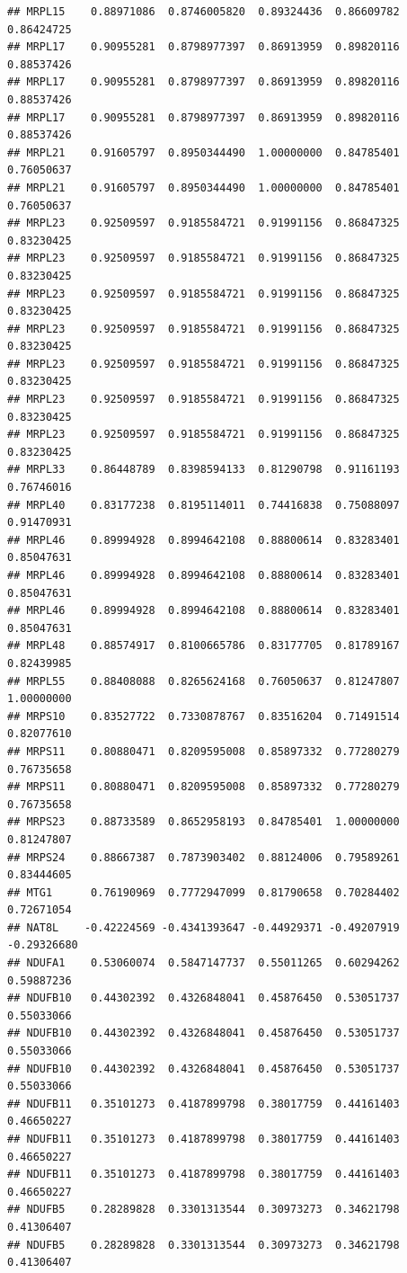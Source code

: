 \documentclass[
]{article}
\begin{document}
\begin{verbatim}
## MRPL15    0.88971086  0.8746005820  0.89324436  0.86609782  0.86424725
## MRPL17    0.90955281  0.8798977397  0.86913959  0.89820116  0.88537426
## MRPL17    0.90955281  0.8798977397  0.86913959  0.89820116  0.88537426
## MRPL17    0.90955281  0.8798977397  0.86913959  0.89820116  0.88537426
## MRPL21    0.91605797  0.8950344490  1.00000000  0.84785401  0.76050637
## MRPL21    0.91605797  0.8950344490  1.00000000  0.84785401  0.76050637
## MRPL23    0.92509597  0.9185584721  0.91991156  0.86847325  0.83230425
## MRPL23    0.92509597  0.9185584721  0.91991156  0.86847325  0.83230425
## MRPL23    0.92509597  0.9185584721  0.91991156  0.86847325  0.83230425
## MRPL23    0.92509597  0.9185584721  0.91991156  0.86847325  0.83230425
## MRPL23    0.92509597  0.9185584721  0.91991156  0.86847325  0.83230425
## MRPL23    0.92509597  0.9185584721  0.91991156  0.86847325  0.83230425
## MRPL23    0.92509597  0.9185584721  0.91991156  0.86847325  0.83230425
## MRPL33    0.86448789  0.8398594133  0.81290798  0.91161193  0.76746016
## MRPL40    0.83177238  0.8195114011  0.74416838  0.75088097  0.91470931
## MRPL46    0.89994928  0.8994642108  0.88800614  0.83283401  0.85047631
## MRPL46    0.89994928  0.8994642108  0.88800614  0.83283401  0.85047631
## MRPL46    0.89994928  0.8994642108  0.88800614  0.83283401  0.85047631
## MRPL48    0.88574917  0.8100665786  0.83177705  0.81789167  0.82439985
## MRPL55    0.88408088  0.8265624168  0.76050637  0.81247807  1.00000000
## MRPS10    0.83527722  0.7330878767  0.83516204  0.71491514  0.82077610
## MRPS11    0.80880471  0.8209595008  0.85897332  0.77280279  0.76735658
## MRPS11    0.80880471  0.8209595008  0.85897332  0.77280279  0.76735658
## MRPS23    0.88733589  0.8652958193  0.84785401  1.00000000  0.81247807
## MRPS24    0.88667387  0.7873903402  0.88124006  0.79589261  0.83444605
## MTG1      0.76190969  0.7772947099  0.81790658  0.70284402  0.72671054
## NAT8L    -0.42224569 -0.4341393647 -0.44929371 -0.49207919 -0.29326680
## NDUFA1    0.53060074  0.5847147737  0.55011265  0.60294262  0.59887236
## NDUFB10   0.44302392  0.4326848041  0.45876450  0.53051737  0.55033066
## NDUFB10   0.44302392  0.4326848041  0.45876450  0.53051737  0.55033066
## NDUFB10   0.44302392  0.4326848041  0.45876450  0.53051737  0.55033066
## NDUFB11   0.35101273  0.4187899798  0.38017759  0.44161403  0.46650227
## NDUFB11   0.35101273  0.4187899798  0.38017759  0.44161403  0.46650227
## NDUFB11   0.35101273  0.4187899798  0.38017759  0.44161403  0.46650227
## NDUFB5    0.28289828  0.3301313544  0.30973273  0.34621798  0.41306407
## NDUFB5    0.28289828  0.3301313544  0.30973273  0.34621798  0.41306407

\end{verbatim}
\end{document}
